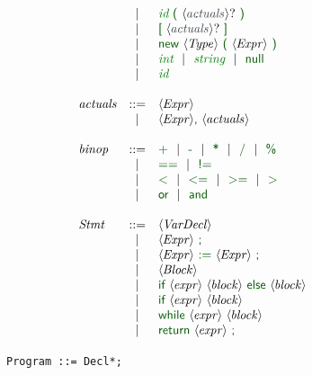 \begin{figure}[H]
\begin{minipage}{0.5\textwidth}
\[\begin{array}[t]{lcl@{\hspace{0.4cm}}}
                     & \VB   & \terminal{id}\ \vterminal{(}\ \ntq{actuals}\ \vterminal{)} \\
                     & \VB   & \vterminal{[}\ \ntq{actuals}\ \vterminal{]} \\
                     & \VB   & \vterminal{new}\ \nt{Type}\ \vterminal{(}\ \nt{Expr}\ \vterminal{)} \\
                     & \VB   & \terminal{int}\ \VB\ \terminal{string}\ \VB\ \vterminal{null} \\
                     & \VB   & \terminal{id} \\
          \\
          \nta{actuals} & \Prod & \nt{Expr} \\
                        & \VB   & \nt{Expr} \vterminal{,}\ \nt{actuals} \\
          \\
          \nta{binop} & \Prod &
              \vterminal{+}
                      \ \VB\ \vterminal{-}
                      \ \VB\ \vterminal{*}
                      \ \VB\ \vterminal{/}
                      \ \VB\ \vterminal{\%}\\
                      & \VB& \vterminal{==}
                      \ \VB\ \vterminal{!=}\\
                      & \VB&  \vterminal{$<$}
                      \ \VB\ \vterminal{$<=$}
                      \ \VB\ \vterminal{$>=$}
                      \ \VB\ \vterminal{$>$}
                      \\
                      & \VB& \vterminal{or}
                      \ \VB\ \vterminal{and}\\
          \\
          \nta{Stmt} & \Prod & \nt{VarDecl} \\
                     & \VB   & \nt{Expr}\ \vterminal{;} \\
                     & \VB   & \nt{Expr}\ \vterminal{:=}\ \nt{Expr}\ \vterminal{;}\\
                     & \VB   & \nt{Block} \\
                     & \VB   & \vterminal{if}\ \nt{expr}\ \nt{block}\ \vterminal{else}\ \nt{block} \\
                     & \VB   & \vterminal{if}\ \nt{expr}\ \nt{block} \\
                     & \VB   & \vterminal{while}\ \nt{expr}\ \nt{block} \\
                     & \VB   & \vterminal{return}\ \nt{expr}\ \vterminal{;}\\
        \end{array}
      \]
        \end{minipage}%
        \begin{minipage}{0.8\textwidth}
            \hfill
\begin{lrbox}{\mylistingbox}
        \begin{lstlisting}[language=ASTGrammar]
    Program ::= Decl*;


\end{lstlisting}
\end{lrbox}
\end{minipage}
\end{figure}

